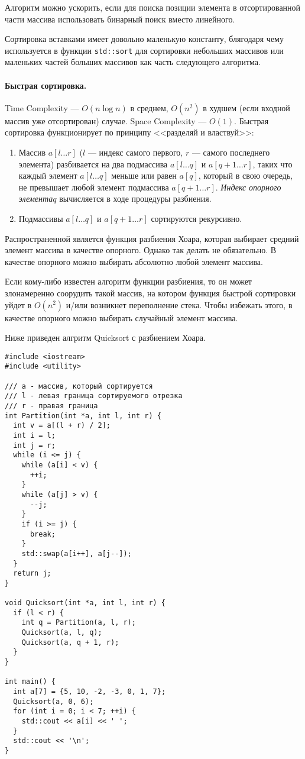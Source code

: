 {\small
Алгоритм можно ускорить, если для поиска позиции элемента в отсортированной части массива
использовать бинарный поиск вместо линейного.

Сортировка вставками имеет довольно маленькую константу, блягодаря чему используется в функции \verb|std::sort|
для сортировки небольших массивов или маленьких частей больших массивов как часть следующего алгоритма. }

\paragraph{Быстрая сортировка.} Time Complexity --- $O(n\log n)$ в среднем, $O(n^2)$
в худшем (если входной массив уже отсортирован) случае. Space Complexity --- $O(1)$.
Быстрая сортировка функционирует по принципу <<разделяй и властвуй>>:
\begin{enumerate}
  \item Массив $a[l\dots r]$ ($l$ --- индекс самого первого, $r$ --- самого последнего элемента)
  разбивается на два подмассива $a[l\dots q]$ и $a[q+1\dots r]$, таких что каждый элемент $a[l\dots q]$
  меньше или равен $a[q]$, который в свою очередь, не превышает любой элемент подмассива $a[q+1\dots r]$.
  \textit{Индекс опорного элемента}$q$ вычисляется в ходе процедуры разбиения.
  \item Подмассивы $a[l\dots q]$ и $a[q+1\dots r]$ сортируются рекурсивно.
\end{enumerate}

Распространенной является функция разбиения Хоара, которая выбирает средний элемент массива
в качестве опорного. Однако так делать не обязательно. В качестве опорного можно выбирать
абсолютно любой элемент массива.

Если кому-либо известен алгоритм функции разбиения, то он может злонамеренно соорудить
такой массив, на котором функция быстрой сортировки уйдет в $O(n^2)$ и/или возникнет
переполнение стека. Чтобы избежать этого, в качестве опорного можно выбирать случайный
элемент массива.

Ниже приведен алгритм Quicksort с разбиением Хоара.
\begin{verbatim}
#include <iostream>
#include <utility>

/// a - массив, который сортируется
/// l - левая граница сортируемого отрезка
/// r - правая граница
int Partition(int *a, int l, int r) {
  int v = a[(l + r) / 2];
  int i = l;
  int j = r;
  while (i <= j) {
    while (a[i] < v) {
      ++i;
    }
    while (a[j] > v) {
      --j;
    }
    if (i >= j) {
      break;
    }
    std::swap(a[i++], a[j--]);
  }
  return j;
}

void Quicksort(int *a, int l, int r) {
  if (l < r) {
    int q = Partition(a, l, r);
    Quicksort(a, l, q);
    Quicksort(a, q + 1, r);
  }
}

int main() {
  int a[7] = {5, 10, -2, -3, 0, 1, 7};
  Quicksort(a, 0, 6);
  for (int i = 0; i < 7; ++i) {
    std::cout << a[i] << ' ';
  }
  std::cout << '\n';
}
\end{verbatim}

